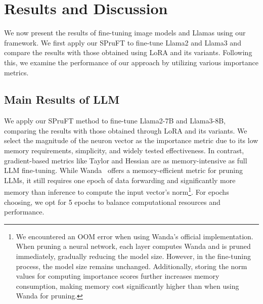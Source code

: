 



\section{Results and Discussion}\label{sec:results}
We now present the results of fine-tuning image models and Llamas using our framework. %
We first apply our SPruFT to fine-tune Llama2 and Llama3 and compare the results with those obtained using LoRA and its variants. Following this, we examine the performance of our approach by utilizing various importance metrics.

\subsection{Main Results of LLM} \label{subsec:results_LLM}

We apply our SPruFT method to fine-tune Llama2-7B and Llama3-8B, comparing the results with those obtained through LoRA and its variants. We select the magnitude of the neuron vector as the importance metric due to its low memory requirements, simplicity, and widely tested effectiveness. In contrast, gradient-based metrics like Taylor and Hessian are as memory-intensive as full LLM fine-tuning. While Wanda~\cite{sunsimple} offers a memory-efficient metric for pruning LLMs, it still requires one epoch of data forwarding and significantly more memory than inference to compute the input vector's norm\footnote{We encountered an OOM error when using Wanda's official implementation. When pruning a neural network, each layer computes Wanda and is pruned immediately, gradually reducing the model size. However, in the fine-tuning process, the model size remains unchanged. Additionally, storing the norm values for computing importance scores further increases memory consumption, making memory cost significantly higher than when using Wanda for pruning.}. For epochs choosing, we opt for 5 epochs to balance computational resources and performance. 

